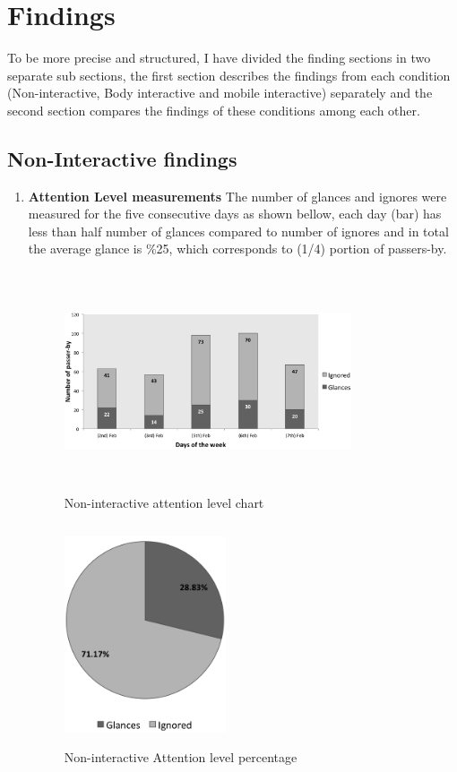 \newpage
\section{Findings}
To be more precise and structured, I have divided the finding sections in two separate sub sections, the first section describes the findings from each condition (Non-interactive, Body interactive and mobile interactive) separately and the second section compares the findings of these conditions among each other.


\subsection{Non-Interactive findings}

\begin{enumerate}

\item \textbf{Attention Level measurements} 
The number of glances and ignores were measured for the five consecutive days as shown bellow, each day (bar) has less than half number of glances compared to number of ignores and in total the average glance is \%25, which corresponds to (1/4) portion of passers-by.


\begin{figure}[H]
    \centering
    \includegraphics[width=0.8\textwidth,height=6.5cm]{Figures/8/non_inter_findings/Non_Inter_chart}%
    \caption{Non-interactive attention level chart}%
    \label{fig:Nonattentionlevelchart}%
\end{figure}


\begin{figure}[H]
    \centering
    \includegraphics[width=0.45\textwidth,height=6.5cm]{Figures/8/non_inter_findings/non_inter_percentage}
    \caption{Non-interactive Attention level percentage}%
    \label{fig:Nonattentionlevelpercentage}%
\end{figure}




\end{enumerate}
